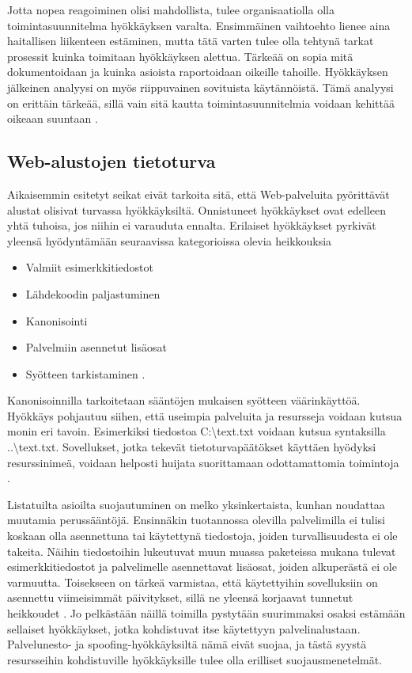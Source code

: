 Jotta nopea reagoiminen olisi mahdollista, tulee organisaatiolla olla
toimintasuunnitelma hyökkäyksen varalta. Ensimmäinen vaihtoehto lienee aina
haitallisen liikenteen estäminen, mutta tätä varten tulee olla tehtynä tarkat
prosessit kuinka toimitaan hyökkäyksen alettua. Tärkeää on sopia mitä
dokumentoidaan ja kuinka asioista raportoidaan oikeille tahoille. Hyökkäyksen
jälkeinen analyysi on myös riippuvainen sovituista käytännöistä. Tämä analyysi
on erittäin tärkeää, sillä vain sitä kautta toimintasuunnitelmia voidaan
kehittää oikeaan suuntaan \cite{DDOS}.

\subsection{Web-alustojen tietoturva}

Aikaisemmin esitetyt seikat eivät tarkoita sitä, että Web-palveluita pyörittävät alustat olisivat
turvassa hyökkäyksiltä. Onnistuneet hyökkäykset ovat edelleen yhtä tuhoisa, jos niihin ei varauduta ennalta.
Erilaiset hyökkäykset pyrkivät yleensä hyödyntämään seuraavissa kategorioissa olevia heikkouksia

\begin{itemize}
\item Valmiit esimerkkitiedostot
\item Lähdekoodin paljastuminen
\item Kanonisointi
\item Palvelmiin asennetut lisäosat
\item Syötteen tarkistaminen \cite{Hacking}.
\end{itemize}
Kanonisoinnilla tarkoitetaan sääntöjen mukaisen syötteen väärinkäyttöä. Hyökkäys pohjautuu siihen,
että useimpia palveluita ja resursseja voidaan kutsua monin eri tavoin. Esimerkiksi tiedostoa C:\textbackslash text.txt voidaan 
kutsua syntaksilla ..\textbackslash text.txt. Sovellukset, jotka tekevät tietoturvapäätökset käyttäen hyödyksi resurssinimeä,
voidaan helposti huijata suorittamaan odottamattomia toimintoja \cite{Hacking}.

Listatuilta asioilta suojautuminen on melko yksinkertaista, kunhan noudattaa muutamia perussääntöjä. Ensinnäkin tuotannossa 
olevilla palvelimilla ei tulisi koskaan olla asennettuna tai käytettynä tiedostoja, joiden turvallisuudesta ei ole
takeita. Näihin tiedostoihin lukeutuvat muun muassa paketeissa mukana tulevat esimerkkitiedostot ja palvelimelle asennettavat 
lisäosat, joiden alkuperästä ei ole varmuutta. Toisekseen on tärkeä varmistaa, että käytettyihin sovelluksiin
on asennettu viimeisimmät päivitykset, sillä ne yleensä korjaavat tunnetut heikkoudet \cite{Hacking}. Jo pelkästään näillä 
toimilla pystytään suurimmaksi osaksi estämään sellaiset hyökkäykset, jotka kohdistuvat itse käytettyyn palvelinalustaan.
Palvelunesto- ja spoofing-hyökkäyksiltä nämä eivät suojaa, ja tästä syystä resursseihin kohdistuville hyökkäyksille
tulee olla erilliset suojausmenetelmät.

